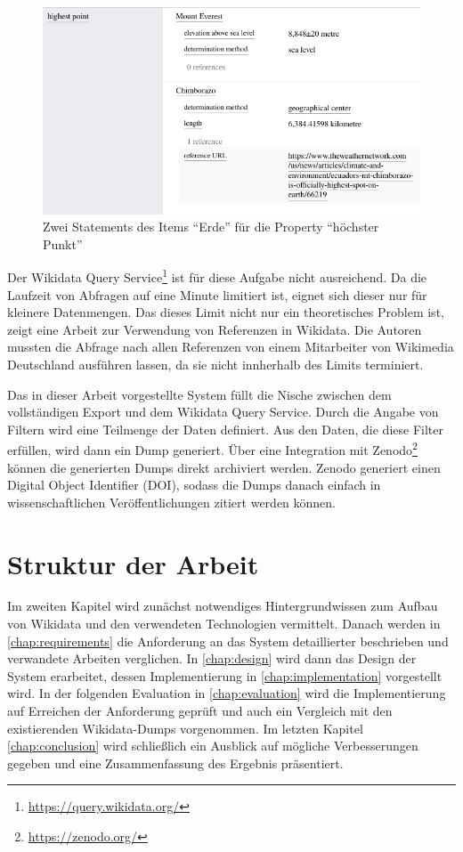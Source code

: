 \begin{figure}
  \includegraphics[width=\linewidth]{pics/example-statement}
  \caption{Zwei Statements des Items ``Erde'' für die Property ``höchster Punkt''}
  \label{fig:sample-statement}
\end{figure} 

Der Wikidata Query Service\footnote{\url{https://query.wikidata.org/}} ist für diese Aufgabe nicht ausreichend.
Da die Laufzeit von Abfragen auf eine Minute limitiert ist, eignet sich dieser nur für kleinere Datenmengen.
Das dieses Limit nicht nur ein theoretisches Problem ist, zeigt eine Arbeit zur Verwendung von Referenzen in Wikidata\cite{wd-wk-common-references}.
Die Autoren mussten die Abfrage nach allen Referenzen von einem Mitarbeiter von Wikimedia Deutschland ausführen lassen, da sie nicht innherhalb des Limits terminiert.

Das in dieser Arbeit vorgestellte System füllt die Nische zwischen dem vollständigen Export und dem Wikidata Query Service.
Durch die Angabe von Filtern wird eine Teilmenge der Daten definiert.
Aus den Daten, die diese Filter erfüllen, wird dann ein Dump generiert.
Über eine Integration mit Zenodo\footnote{\url{https://zenodo.org/}} können die generierten Dumps direkt archiviert werden.
Zenodo generiert einen Digital Object Identifier (DOI), sodass die Dumps danach einfach in wissenschaftlichen Veröffentlichungen zitiert werden können.

\section{Struktur der Arbeit}
Im zweiten Kapitel wird zunächst notwendiges Hintergrundwissen zum Aufbau von Wikidata und den verwendeten Technologien vermittelt.
Danach werden in \cref{chap:requirements} die Anforderung an das System detaillierter beschrieben und verwandete Arbeiten verglichen.
In \cref{chap:design} wird dann das Design der System erarbeitet, dessen Implementierung in \cref{chap:implementation} vorgestellt wird.
In der folgenden Evaluation in \cref{chap:evaluation} wird die Implementierung auf Erreichen der Anforderung geprüft und auch ein Vergleich mit den existierenden Wikidata-Dumps vorgenommen.
Im letzten Kapitel \cref{chap:conclusion} wird schließlich ein Ausblick auf mögliche Verbesserungen gegeben und eine Zusammenfassung des Ergebnis präsentiert.

